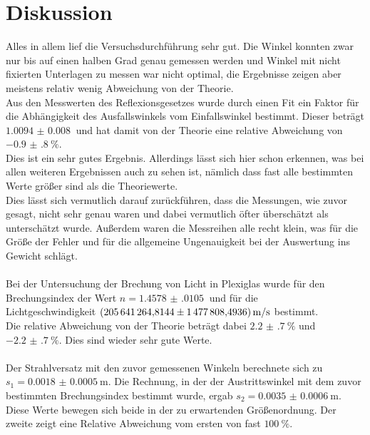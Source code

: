\newpage
\section{Diskussion}

Alles in allem lief die Versuchsdurchführung sehr gut.
Die Winkel konnten zwar nur bis auf einen halben Grad genau gemessen werden und Winkel mit nicht fixierten Unterlagen zu messen war nicht optimal, die Ergebnisse zeigen aber meistens relativ wenig Abweichung von der Theorie.\\

\noindent Aus den Messwerten des Reflexionsgesetzes wurde durch einen Fit ein Faktor für die Abhängigkeit des Ausfallswinkels vom Einfallswinkel bestimmt.
Dieser beträgt $\SI{1.0094(80)}{}$  und hat damit von der Theorie eine relative Abweichung von $\SI{-0.9(8)}{\percent}$.\\
Dies ist ein sehr gutes Ergebnis. Allerdings lässt sich hier schon erkennen, was bei allen weiteren Ergebnissen auch zu sehen ist, nämlich dass fast alle bestimmten Werte größer sind als die Theoriewerte.\\
Dies lässt sich vermutlich darauf zurückführen, dass die Messungen, wie zuvor gesagt, nicht sehr genau waren und dabei vermutlich öfter überschätzt als unterschätzt wurde.
Außerdem waren die Messreihen alle recht klein, was für die Größe der Fehler und für die allgemeine Ungenauigkeit bei der Auswertung ins Gewicht schlägt.\\\\
Bei der Untersuchung der Brechung von Licht in Plexiglas wurde für den Brechungsindex der Wert $n= \SI{1.4578(0105)}{}$ und für die \\Lichtgeschwindigkeit $\SI{205641264.8144 (14778084936)}{\metre\per\second}$ bestimmt.\\
Die relative Abweichung von der Theorie beträgt dabei $\SI{2.2(7)}{\percent}$ und $\SI{-2.2(7)}{\percent}$. Dies sind wieder sehr gute Werte.\\\\
Der Strahlversatz mit den zuvor gemessenen Winkeln berechnete sich zu \\$s_1=\SI{0.0018(5)}{\metre}$. 
Die Rechnung, in der der Austrittswinkel mit dem zuvor bestimmten Brechungsindex bestimmt wurde, ergab $s_2=\SI{0.0035(6)}{\metre}$.\\
Diese Werte bewegen sich beide in der zu erwartenden Größenordnung. Der zweite zeigt eine Relative Abweichung vom ersten von fast $\SI{100}{\percent}$. \\
